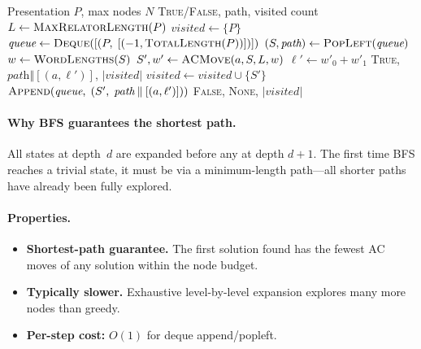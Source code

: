 \documentclass[11pt,a4paper]{article}
\begin{document}
\begin{algorithm}[H]
\caption{Breadth-First Search for AC Trivialisation}
\label{alg:bfs}
\begin{algorithmic}[1]
\Require Presentation $P$, max nodes $N$
\Ensure \textsc{True}/\textsc{False}, path, visited count
\State $L \gets \textsc{MaxRelatorLength}(P)$
\State $\textit{visited} \gets \{P\}$
\State $\textit{queue} \gets \textsc{Deque}([(P,\; [(-1, \textsc{TotalLength}(P))])])$
  \State $(S, \textit{path}) \gets \textsc{PopLeft}(\textit{queue})$
  \State $w \gets \textsc{WordLengths}(S)$
    \State $S', w' \gets \textsc{ACMove}(a, S, L, w)$
    \State $\ell' \gets w'_0 + w'_1$
      \State \Return \textsc{True}, $\textit{path} \mathbin\Vert [(a, \ell')]$, $|\textit{visited}|$
    \EndIf
      \State $\textit{visited} \gets \textit{visited} \cup \{S'\}$
      \State $\textsc{Append}(\textit{queue},\; (S',\; \textit{path} \mathbin\Vert [(a, \ell')]))$
    \EndIf
  \EndFor
\EndWhile
\State \Return \textsc{False}, \textsc{None}, $|\textit{visited}|$
\end{algorithmic}
\end{algorithm}

\paragraph{Why BFS guarantees the shortest path.}
All states at depth~$d$ are expanded before any at depth $d+1$.  The first
time BFS reaches a trivial state, it must be via a minimum-length path---all
shorter paths have already been fully explored.

\paragraph{Properties.}
\begin{itemize}[nosep]
  \item \textbf{Shortest-path guarantee.}  The first solution found has the
    fewest AC moves of any solution within the node budget.
  \item \textbf{Typically slower.}  Exhaustive level-by-level expansion explores
    many more nodes than greedy.
  \item \textbf{Per-step cost:} $O(1)$ for deque append/popleft.
\end{itemize}
\end{document}
